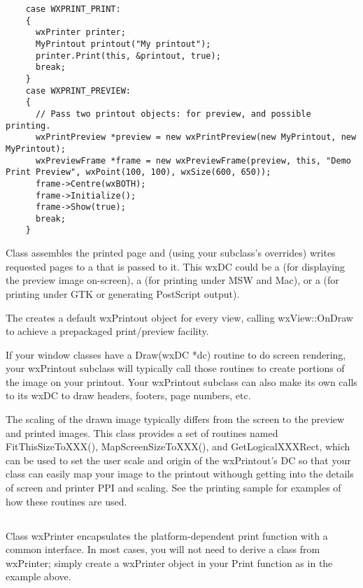 \begin{verbatim}
    case WXPRINT_PRINT:
    {
      wxPrinter printer;
      MyPrintout printout("My printout");
      printer.Print(this, &printout, true);
      break;
    }
    case WXPRINT_PREVIEW:
    {
      // Pass two printout objects: for preview, and possible printing.
      wxPrintPreview *preview = new wxPrintPreview(new MyPrintout, new MyPrintout);
      wxPreviewFrame *frame = new wxPreviewFrame(preview, this, "Demo Print Preview", wxPoint(100, 100), wxSize(600, 650));
      frame->Centre(wxBOTH);
      frame->Initialize();
      frame->Show(true);
      break;
    }
\end{verbatim}

Class  assembles the printed page and (using
your subclass's overrides) writes requested pages to a  that
is passed to it. This wxDC could be a  (for
displaying the preview image on-screen), a 
(for printing under MSW and Mac), or a 
(for printing under GTK or generating PostScript output).

The  creates a default
wxPrintout object for every view, calling wxView::OnDraw to achieve a
prepackaged print/preview facility.

If your window classes have a Draw(wxDC *dc) routine to do screen rendering,
your wxPrintout subclass will typically call those routines to create portions
of the image on your printout. Your wxPrintout subclass can also make its own
calls to its wxDC to draw headers, footers, page numbers, etc.

The scaling of the drawn image typically differs from the screen to the preview
and printed images. This class provides a set of routines named
FitThisSizeToXXX(), MapScreenSizeToXXX(), and GetLogicalXXXRect, which can be
used to set the user scale and origin of the wxPrintout's DC so that your class
can easily map your image to the printout withough getting into the details of
screen and printer PPI and scaling. See the printing sample for examples of how
these routines are used.

\subsection{}

Class wxPrinter encapsulates the platform-dependent print function with a common
interface. In most cases, you will not need to derive a class from wxPrinter;
simply create a wxPrinter object in your Print function as in the example above.

